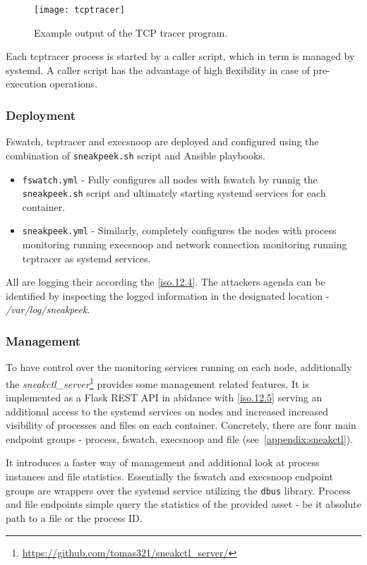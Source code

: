 \begin{figure}[h]
	\centering
	\texttt{[image: tcptracer]}
	\caption{Example output of the TCP tracer program.}
	\label{image:implementation:tcptracer}
\end{figure}

Each tcptracer process is started by a caller script, which in term is managed by systemd. A caller script has the advantage of high flexibility in case of pre-execution operations.

\subsubsection*{Deployment \label{implementation:mon:hunting:deploy}}
Fswatch, tcptracer and execsnoop are deployed and configured using the combination of \texttt{sneakpeek.sh} script and Ansible playbooks.
\begin{itemize}
	\item \texttt{fswatch.yml} - Fully configures all nodes with fswatch by runnig the \texttt{sneakpeek.sh} script and ultimately starting systemd services for each container.
	\item \texttt{sneakpeek.yml} - Similarly, completely configures the nodes with process monitoring running execsnoop and network connection monitoring running tcptracer as systemd services.
\end{itemize}
All are logging their according the \ref{iso.12.4}. The attackers agenda can be identified by inspecting the logged information in the designated location - \textit{/var/log/sneakpeek}. 

\subsubsection*{Management \label{implementation:mon:hunting:mgmt}}
To have control over the monitoring services running on each node, additionally the \textit{sneakctl\_server}\footnote{\url{https://github.com/tomas321/sneakctl_server/}} provides some management related features. It is implemented as a Flask REST API in abidance with \ref{iso.12.5} serving an additional access to the systemd services on nodes and increased increased visibility of processes and files on each container. Concretely, there are four main endpoint groups - process, fswatch, execsnoop and file (see~\autoref{appendix:sneakctl}).

It introduces a faster way of management and additional look at process instances and file statistics. Essentially the fswatch and execsnoop endpoint groups are wrappers over the systemd service utilizing the \texttt{dbus} library. Process and file endpoints simple query the statistics of the provided asset - be it absolute path to a file or the process ID.


